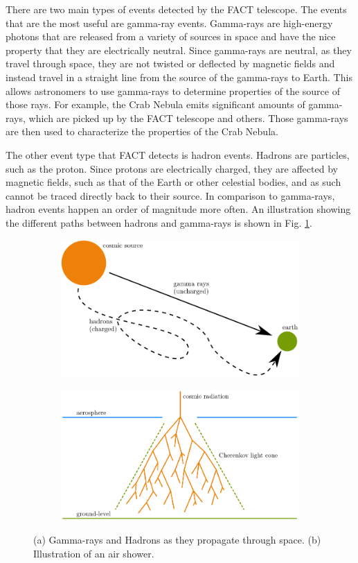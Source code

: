 \documentclass[12pt]{article}
\begin{document}
There are two main types of events detected by the FACT telescope. The events that are the most useful are gamma-ray events. Gamma-rays are high-energy photons that are released from a variety of sources in space and have the nice property that they are electrically neutral. Since gamma-rays are neutral, as they travel through space, they are not twisted or deflected by magnetic fields and instead travel in a straight line from the source of the gamma-rays to Earth. This allows astronomers to use gamma-rays to determine properties of the source of those rays. For example, the Crab Nebula emits significant amounts of gamma-rays, which are picked up by the FACT telescope and others. Those gamma-rays are then used to characterize the properties of the Crab Nebula.

The other event type that FACT detects is hadron events. Hadrons are particles, such as the proton. Since protons are electrically charged, they are affected by magnetic fields, such as that of the Earth or other celestial bodies, and as such cannot be traced directly back to their source. In comparison to gamma-rays, hadron events happen an order of magnitude more often\cite{ANDERHUB2011107}. An illustration showing the different paths between hadrons and gamma-rays is shown in Fig. \ref{fig:cosmic}.

\begin{figure}[!htb]
\centering
\begin{subfigure}[t]{1\textwidth}
  \centering
\includegraphics[width=10cm, keepaspectratio]{Screenshot_20171128_100930.png}
\caption{}
\label{fig:cosmic}
\end{subfigure}
\hfill
\centering
\begin{subfigure}[t]{1\textwidth}
  \centering
\includegraphics[width=10cm, keepaspectratio]{Screenshot_20171128_101617.png}
\caption{}
\label{fig:airshower}
\end{subfigure}
\caption{(a) Gamma-rays and Hadrons as they propagate through space. (b) Illustration of an air shower\cite{behnken_2017}.}
\end{figure}
\end{document}
